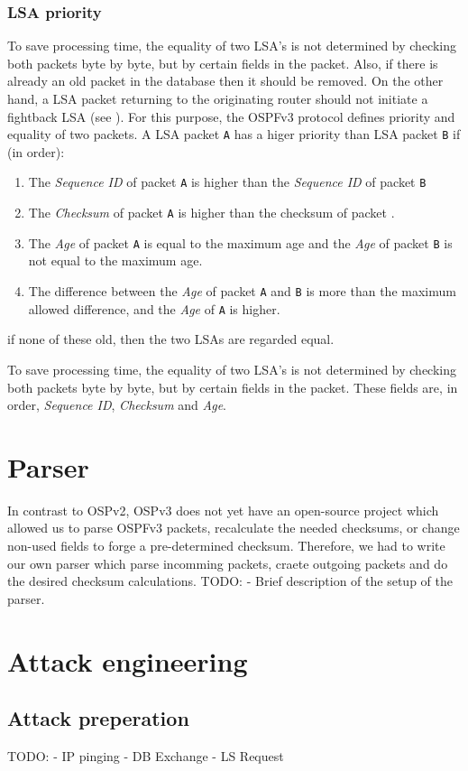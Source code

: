 \documentclass[11pt,a4paper,oneside]{article}
\newcommand{\lsection}[2]{\section{#1}\label{sec:#2}}
\newcommand{\lsubsection}[2]{\subsection{#1}\label{sec:#2}}
\newcommand{\lsubsubsection}[2]{\subsubsection{#1}\label{sec:#2}}
\begin{document}
			\lsubsubsection{LSA priority}{lsa_priority}
				To save processing time, the equality of two LSA's is not determined by checking both packets byte by byte, but by certain fields in the packet. Also, if there is already an old packet in the database then it should be removed. On the other hand, a LSA packet returning to the originating router should not initiate a fightback LSA (see ). For this purpose, the OSPFv3 protocol defines priority and equality of two packets.
				A LSA packet \texttt{A} has a higer priority than LSA packet \texttt{B} if (in order):
				\begin{enumerate}
					\item The \textit{Sequence ID} of packet \texttt{A} is higher than the \textit{Sequence ID} of packet \texttt{B}
					\item The \textit{Checksum} of packet \texttt{A} is higher than the checksum of packet .
					\item The \textit{Age} of packet \texttt{A} is equal to the maximum age and the \textit{Age} of packet \texttt{B} is not equal to the maximum age.
					\item The difference between the \textit{Age} of packet \texttt{A} and \texttt{B} is more than the maximum allowed difference, and the \textit{Age} of \texttt{A} is higher.
				\end{enumerate}
				
				if none of these old, then the two LSAs are regarded equal.
				
			To save processing time, the equality of two LSA's is not determined by checking both packets byte by byte, but by certain fields in the packet. These fields are, in order, \textit{Sequence ID}, \textit{Checksum} and \textit{Age}.
    		
	\lsection{Parser}{parser}
   		In contrast to OSPv2, OSPv3 does not yet have an open-source project which allowed us to parse OSPFv3 packets, recalculate the needed checksums, or change non-used fields to forge a pre-determined checksum. Therefore, we had to write our own parser which parse incomming packets, craete outgoing packets and do the desired checksum calculations.
    		TODO:
    		- Brief description of the setup of the parser.
   		
   	\lsection{Attack engineering}{attack}
   		\lsubsection{Attack preperation}{attack_prep}
   			TODO:
			- IP pinging
	    		- DB Exchange
	    		- LS Request
    			
\end{document}
